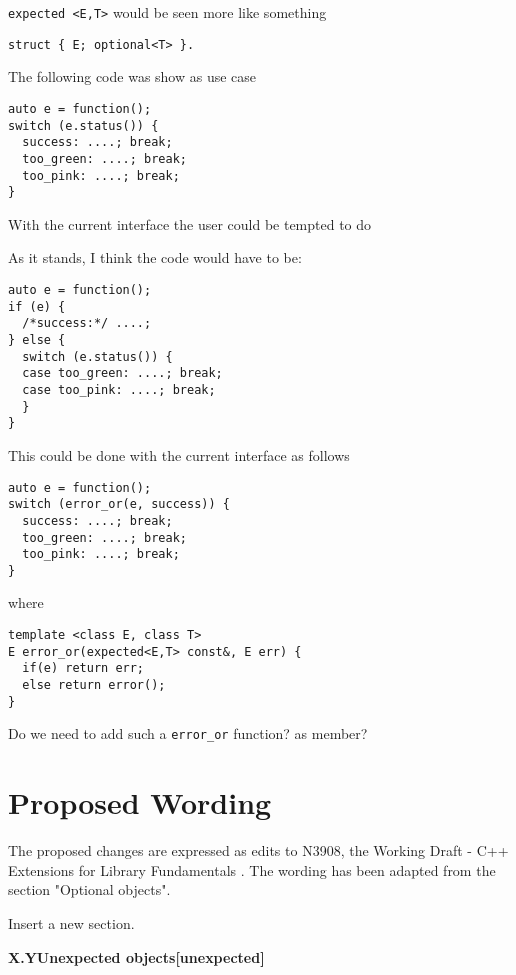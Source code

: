\documentclass[a4paper,10pt]{article}
\newcommand{\wordingSec}[2]{\vspace{15pt}
\noindent
{\large\textbf{X.Y\quad #1\hfill\textbf{[#2]}}}
}
\newcommand{\cpp}[1]{\lstinline{#1}}
\begin{document}
\cpp{expected <E,T>} would be seen more like something  

\begin{lstlisting}
struct { E; optional<T> }. 
\end{lstlisting}

The following code was show as use case

\begin{lstlisting}
auto e = function();
switch (e.status()) {
  success: ....; break;
  too_green: ....; break;
  too_pink: ....; break;
} 
\end{lstlisting}

With the current interface the user could be tempted to do

As it stands, I think the code would have to be:

\begin{lstlisting}
auto e = function();
if (e) {
  /*success:*/ ....;
} else {
  switch (e.status()) {
  case too_green: ....; break;
  case too_pink: ....; break;
  }
} 
\end{lstlisting}

This could be done with the current interface as follows

\begin{lstlisting}
auto e = function();
switch (error_or(e, success)) {
  success: ....; break;
  too_green: ....; break;
  too_pink: ....; break;
} 
\end{lstlisting}

where

\begin{lstlisting}
template <class E, class T>
E error_or(expected<E,T> const&, E err) {
  if(e) return err;
  else return error();
}
\end{lstlisting}

Do we need to add such a \cpp{error_or} function? as member? 

\section{Proposed Wording}


The proposed changes are expressed as edits to N3908, the Working Draft - C++ Extensions for Library Fundamentals \cite{FundamentalsV1}. The wording has been adapted from the section  "Optional objects".
\newline

Insert a new section. 

\wordingSec{Unexpected objects}{unexpected}
\end{document}

